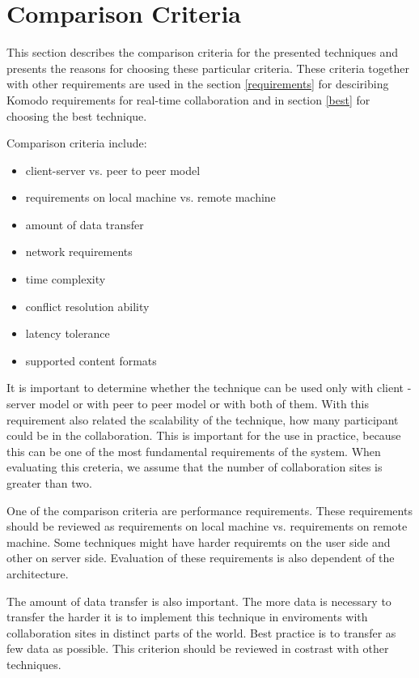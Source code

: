 \documentclass[12pt,oneside]{fithesis2}
\begin{document}
\section{Comparison Criteria} \label{comparison}
This section describes the comparison criteria for the presented techniques and presents the reasons for choosing these particular criteria. These criteria together with other requirements are used in the section \ref{requirements} for desciribing Komodo requirements for real-time collaboration and in section \ref{best} for choosing the best technique.
\par Comparison criteria include:
\begin{itemize}
\item client-server vs. peer to peer model
\item requirements on local machine vs. remote machine
\item amount of data transfer
\item network requirements
\item time complexity
\item conflict resolution ability
\item latency tolerance
\item supported content formats
\end{itemize}
\par It is important to determine whether the technique can be used only with client - server model or with peer to peer model or with both of them. With this requirement also related the scalability of the technique, how many participant could be in the collaboration. This is important for the use in practice, because this can be one of the most fundamental requirements of the system. When evaluating this creteria, we assume that the number of collaboration sites is greater than two.
\par One of the comparison criteria are performance requirements. These requirements should be reviewed as requirements on local machine vs. requirements on remote machine. Some techniques might have harder requiremts on the user side and other on server side.  Evaluation of these requirements is also dependent of the architecture.
\par The amount of data transfer is also important. The more data is necessary to transfer the harder it is to implement this technique in enviroments with collaboration sites in distinct parts of the world. Best practice is to transfer as few data as possible. This criterion should be reviewed in costrast with other techniques.
\end{document}

